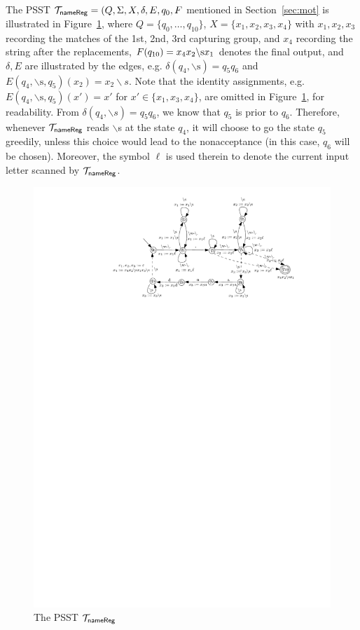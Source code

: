 \begin{example}
The PSST $\mathcal{T}_{\sf nameReg}=(Q, \Sigma, X, \delta, E,  q_{0}, F$ mentioned in Section~\ref{sec:mot} is illustrated in Figure~\ref{fig-psst-exmp}, where $Q = \{q_0, \dots, q_{10}\}$, $X= \{x_1, x_2, x_3, x_4\}$ with $x_1, x_2, x_3$ recording the matches of the 1st, 2nd, 3rd capturing group, and $x_4$ recording the string after the replacements, $F(q_{10}) = x_4 x_2 \backslash {\rm s} x_1$ denotes the final output, and $\delta, E$ are illustrated by the edges, e.g. $\delta(q_4, \backslash\mbox{s}) = q_5q_{6}$ and $E(q_4, \backslash\mbox{s}, q_5)(x_2) = x_2 \backslash s$.  Note that the identity assignments, e.g. $E(q_4, \backslash\mbox{s}, q_5)(x') = x'$ for $x' \in \{x_1, x_3, x_4\}$, are omitted in Figure~\ref{fig-psst-exmp}, for readability. From $\delta(q_4, \backslash s) = q_5q_{6}$, we know that $q_5$ is prior to $q_6$. Therefore, whenever $\mathcal{T}_{\sf nameReg}$ reads $\backslash$s at the state $q_4$,  it will choose to go the state $q_5$ greedily, unless this choice would lead to the nonacceptance (in this case, $q_6$ will be chosen). Moreover, the symbol $\ell$ is used therein to denote the current input letter scanned by $\mathcal{T}_{\sf nameReg}$.
\begin{figure}[ht]
\centering
\includegraphics{psst-exmp.pdf}
\caption{The PSST $\mathcal{T}_{\sf nameReg}$}
\label{fig-psst-exmp}
\end{figure}
\end{example}

